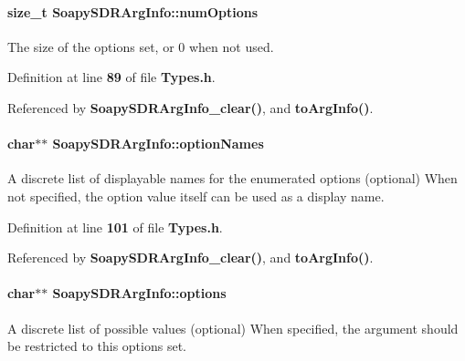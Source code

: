 \paragraph[{num\+Options}]{\setlength{\rightskip}{0pt plus 5cm}size\+\_\+t Soapy\+S\+D\+R\+Arg\+Info\+::num\+Options}\label{structSoapySDRArgInfo_a2e55efc4b09051aed4b7342cba94174f}


The size of the options set, or 0 when not used. 



Definition at line {\bf 89} of file {\bf Types.\+h}.



Referenced by {\bf Soapy\+S\+D\+R\+Arg\+Info\+\_\+clear()}, and {\bf to\+Arg\+Info()}.

\paragraph[{option\+Names}]{\setlength{\rightskip}{0pt plus 5cm}char$\ast$$\ast$ Soapy\+S\+D\+R\+Arg\+Info\+::option\+Names}\label{structSoapySDRArgInfo_a929fed72ea300d13e8d042e574147f0e}
A discrete list of displayable names for the enumerated options (optional) When not specified, the option value itself can be used as a display name. 

Definition at line {\bf 101} of file {\bf Types.\+h}.



Referenced by {\bf Soapy\+S\+D\+R\+Arg\+Info\+\_\+clear()}, and {\bf to\+Arg\+Info()}.

\paragraph[{options}]{\setlength{\rightskip}{0pt plus 5cm}char$\ast$$\ast$ Soapy\+S\+D\+R\+Arg\+Info\+::options}\label{structSoapySDRArgInfo_a62a9a7757c920642e802d3151fbac348}
A discrete list of possible values (optional) When specified, the argument should be restricted to this options set. 


